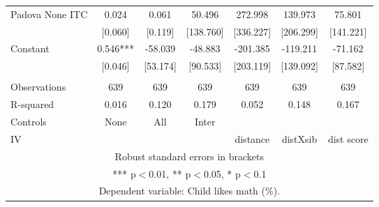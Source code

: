 \begin{tabular}{lcccccc}
Padova None ITC & 0.024 & 0.061 & 50.496 & 272.998 & 139.973 & 75.801 \\
 & [0.060] & [0.119] & [138.760] & [336.227] & [206.299] & [141.221] \\
Constant & 0.546*** & -58.039 & -48.883 & -201.385 & -119.211 & -71.162 \\
 & [0.046] & [53.174] & [90.533] & [203.119] & [139.092] & [87.582] \\
 &  &  &  &  &  &  \\
Observations & 639 & 639 & 639 & 639 & 639 & 639 \\
R-squared & 0.016 & 0.120 & 0.179 & 0.052 & 0.148 & 0.167 \\
Controls & None & All & Inter &  &  &  \\
 IV &  &  &  & distance & distXsib & dist score \\ \hline
\multicolumn{7}{c}{ Robust standard errors in brackets} \\
\multicolumn{7}{c}{ *** p$<$0.01, ** p$<$0.05, * p$<$0.1} \\
\multicolumn{7}{c}{ Dependent variable: Child likes math (\%).} \\
\end{tabular}
